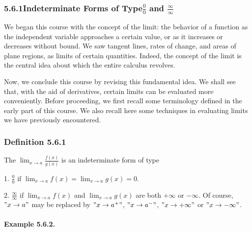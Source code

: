 \documentclass[
  letterpaper,
  DIV=11,
  numbers=noendperiod]{scrartcl}
\let\oldparagraph\paragraph
\renewcommand{\paragraph}[1]{\oldparagraph{#1}\mbox{}}
\theoremstyle{plain}
\theoremstyle{remark}
\begin{document}
\hypertarget{htm:Indeterminateforms}{}
\hypertarget{indeterminate-forms-of-typefrac00-and-fracinftyinfty}{%
\subsubsection{\texorpdfstring{5.6.1Indeterminate Forms of
Type\(\frac{0}{0}\) and
\(\frac{\infty}{\infty}\)}{5.6.1Indeterminate Forms of Type\textbackslash frac\{0\}\{0\} and \textbackslash frac\{\textbackslash infty\}\{\textbackslash infty\}}}\label{indeterminate-forms-of-typefrac00-and-fracinftyinfty}}

We began this course with the concept of the limit: the behavior of a
function as the independent variable approaches a certain value, or as
it increases or decreases without bound. We saw tangent lines, rates of
change, and areas of plane regions, as limits of certain quantities.
Indeed, the concept of the limit is the central idea about which the
entire calculus revolves.

Now, we conclude this course by revising this fundamental idea. We shall
see that, with the aid of derivatives, certain limits can be evaluated
more conveniently. Before proceeding, we first recall some terminology
defined in the early part of this course. We also recall here some
techniques in evaluating limits we have previously encountered.

\hypertarget{def:Definition}{}
\hypertarget{definition-5.6.1}{%
\subsubsection{Definition 5.6.1}\label{definition-5.6.1}}

The \(\displaystyle\lim_{x \to a} \frac{f(x)}{g(x)}\) is an
indeterminate form of type

1. \(\frac{0}{0}\) if
\(\displaystyle\lim_{x \to a} f(x) = \displaystyle\lim_{x \to a} g(x)=0\).

2. \(\frac{\infty}{\infty}\) if \(\displaystyle\lim_{x \to a} f(x)\) and
\(\displaystyle\lim_{x \to a} g(x)\) are both \(+\infty\) or
\(-\infty\). Of course, \("x \to a"\) may be replaced by
\("x \to a^+"\), \("x \to a^-"\), \("x \to +\infty"\) or
\("x \to -\infty"\).

\hypertarget{example-5.6.2.}{%
\paragraph{Example 5.6.2.}\label{example-5.6.2.}}
\end{document}

